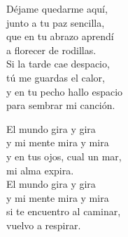 \begin{lyrics}
Déjame quedarme aquí,\\
junto a tu paz sencilla,\\
que en tu abrazo aprendí\\
a florecer de rodillas.\\
Si la tarde cae despacio,\\
tú me guardas el calor,\\
y en tu pecho hallo espacio\\
para sembrar mi canción.

El mundo gira y gira\\
y mi mente mira y mira\\
y en tus ojos, cual un mar,\\
mi alma expira.\\
El mundo gira y gira\\
y mi mente mira y mira\\
si te encuentro al caminar,\\
vuelvo a respirar.
\end{lyrics}

